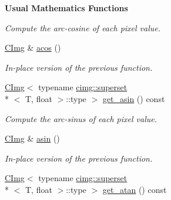 \begin{Indent}{\bf Usual Mathematics Functions}
\begin{DoxyCompactItemize}
\begin{DoxyCompactList}\small\item\em Compute the arc-\/cosine of each pixel value. \end{DoxyCompactList}\item 
\hypertarget{structcimg__library_1_1_c_img_a97c809dd1e8e6491246f33c033a694d9}{\hyperlink{structcimg__library_1_1_c_img}{C\-Img} \& \hyperlink{structcimg__library_1_1_c_img_a97c809dd1e8e6491246f33c033a694d9}{acos} ()}\label{structcimg__library_1_1_c_img_a97c809dd1e8e6491246f33c033a694d9}

\begin{DoxyCompactList}\small\item\em In-\/place version of the previous function. \end{DoxyCompactList}\item 
\hypertarget{structcimg__library_1_1_c_img_aee600a732d1896300b16d689f47bc25a}{\hyperlink{structcimg__library_1_1_c_img}{C\-Img}$<$ typename \hyperlink{structcimg__library_1_1cimg_1_1superset}{cimg\-::superset}\\*
$<$ T, float $>$\-::type $>$ \hyperlink{structcimg__library_1_1_c_img_aee600a732d1896300b16d689f47bc25a}{get\-\_\-asin} () const }\label{structcimg__library_1_1_c_img_aee600a732d1896300b16d689f47bc25a}

\begin{DoxyCompactList}\small\item\em Compute the arc-\/sinus of each pixel value. \end{DoxyCompactList}\item 
\hypertarget{structcimg__library_1_1_c_img_a4275abf989c98e113d046b03a55862bb}{\hyperlink{structcimg__library_1_1_c_img}{C\-Img} \& \hyperlink{structcimg__library_1_1_c_img_a4275abf989c98e113d046b03a55862bb}{asin} ()}\label{structcimg__library_1_1_c_img_a4275abf989c98e113d046b03a55862bb}

\begin{DoxyCompactList}\small\item\em In-\/place version of the previous function. \end{DoxyCompactList}\item 
\hypertarget{structcimg__library_1_1_c_img_a688102d90e7b48aea606897bee5f8c96}{\hyperlink{structcimg__library_1_1_c_img}{C\-Img}$<$ typename \hyperlink{structcimg__library_1_1cimg_1_1superset}{cimg\-::superset}\\*
$<$ T, float $>$\-::type $>$ \hyperlink{structcimg__library_1_1_c_img_a688102d90e7b48aea606897bee5f8c96}{get\-\_\-atan} () const }\label{structcimg__library_1_1_c_img_a688102d90e7b48aea606897bee5f8c96}


\end{DoxyCompactItemize}
\end{Indent}
